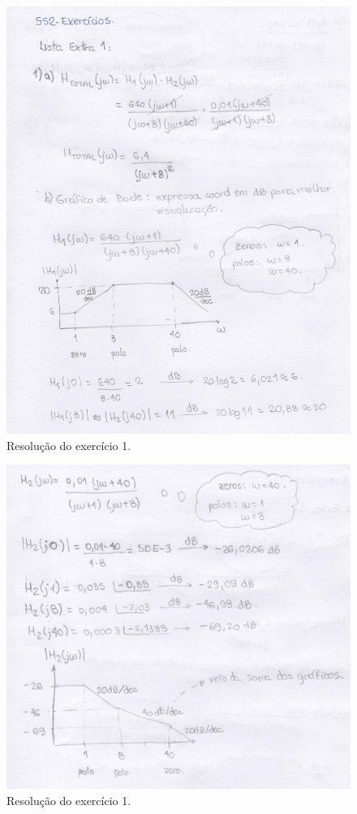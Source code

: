 \documentclass[a4paper,12pt,oneside,openany,table,xcdraw]{article}
\begin{document}
\begin{figure}[H]
\centering
\captionsetup{font=scriptsize}
\includegraphics[width=14.5cm]{scan1}
\caption{Resolução do exercício 1.}
\label{scan:1}
\end{figure}

\begin{figure}[H]
\centering
\captionsetup{font=scriptsize}
\includegraphics[width=14.5cm]{scan2}
\caption{Resolução do exercício 1.}
\label{scan:1}
\end{figure}
\end{document}
